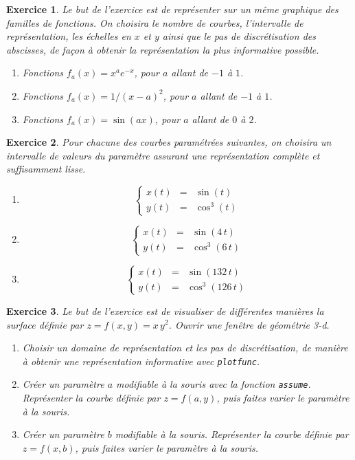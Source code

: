 \documentclass{article}
\newtheorem{exo}{Exercice}[section]
\begin{document}
\begin{exo}{\rm
Le but de l'exercice est de repr\'esenter sur un m\^eme graphique
des familles de fonctions. On choisira le nombre de courbes, l'intervalle
de repr\'esen\-tation, les \'echelles en $x$ et $y$ ainsi que le 
pas de discr\'etisation des abscisses, de fa\c{c}on \`a obtenir 
la repr\'esentation la plus informative possible. 
\begin{enumerate}
\item 
Fonctions $f_a(x) = x^ae^{-x}$, pour $a$ allant de $-1$ \`a $1$. 
\item
Fonctions $f_a(x)=1/(x-a)^2$, pour $a$ allant de $-1$ \`a $1$.
\item
Fonctions $f_a(x)=\sin(ax)$, pour $a$ allant de $0$ \`a $2$.
\end{enumerate} 
}\end{exo}
\begin{exo}{\rm
Pour chacune des courbes param\'etr\'ees suivantes, on choisira un
intervalle de valeurs du param\`etre 
assurant une repr\'esentation compl\`ete et suffisamment lisse. 
\begin{enumerate}
\item
$$
\left\{
\begin{array}{lcl}
x(t)&=& \sin(t)\\
y(t)&=& \cos^3(t)
\end{array}
\right.
$$
\item
$$
\left\{
\begin{array}{lcl}
x(t)&=& \sin(4\,t)\\
y(t)&=& \cos^3(6\,t)
\end{array}
\right.
$$
\item
$$
\left\{
\begin{array}{lcl}
x(t)&=& \sin(132\,t)\\
y(t)&=& \cos^3(126\,t)
\end{array}
\right.
$$
\end{enumerate} 
}\end{exo}
\begin{exo}{\rm
Le but de l'exercice est de visualiser de diff\'erentes mani\`eres
la surface d\'efinie  par $z=f(x,y)=x\,y^2$. Ouvrir une fen\^etre
de g\'eom\'etrie 3-d.
\begin{enumerate}
\item
Choisir un domaine de repr\'esentation et les pas de discr\'etisation,
de mani\`ere \`a obtenir une repr\'esentation informative
avec \verb+plotfunc+. 
\item
Cr\'eer un param\`etre $a$ modifiable \`a la souris
avec la fonction \verb|assume|.
Repr\'esenter la courbe d\'efinie par $z=f(a,y)$, puis faites
varier le param\`etre \`a la souris.
\item
Cr\'eer un param\`etre $b$ modifiable \`a la souris.
Repr\'esenter la courbe d\'efinie par $z=f(x,b)$, puis faites
varier le param\`etre \`a la souris.
\end{enumerate} 
}\end{exo}
\end{document}
